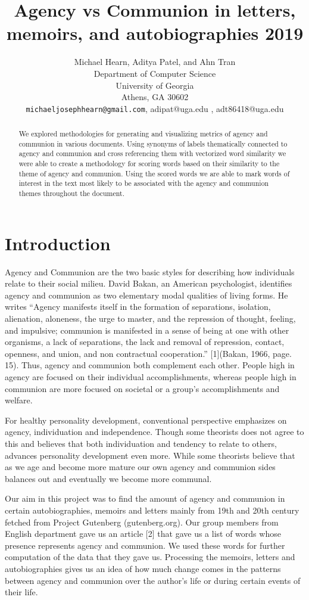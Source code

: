 \documentclass{article}
\title{Agency vs Communion in letters, memoirs, and autobiographies  2019}
\author{%
  Michael Hearn, Aditya Patel, and  Ahn Tran\\ %
  Department of Computer Science\\
  University of Georgia\\
  Athens, GA 30602 \\
  \texttt{michaeljosephhearn@gmail.com}, {adipat@uga.edu} , {adt86418@uga.edu}\\
}
\begin{document}
\maketitle

\begin{abstract}
   We explored methodologies for generating and visualizing metrics of agency and communion in various documents.
   Using synonyms of labels thematically connected to agency and communion and cross referencing them with vectorized word similarity we were able to create a methodology for scoring words based on their similarity to the theme of agency and communion. Using the scored words we are able to mark words of interest in the text most likely to be associated with the agency and communion themes throughout the document.
    
\end{abstract}

\section{Introduction}

Agency and Communion are the two basic styles for describing how individuals relate to their social milieu. David Bakan, an American psychologist, identifies agency and communion as two elementary modal qualities of living forms. He writes “Agency manifests itself in the formation of separations, isolation, alienation, aloneness, the urge to master, and the repression of thought, feeling, and impulsive; communion is manifested in a sense of being at one with other organisms, a lack of separations, the lack and removal of repression, contact, openness, and union, and non contractual cooperation.” [1](Bakan, 1966, page. 15). Thus, agency and communion both complement each other. People high in agency are focused on their individual accomplishments, whereas people high in communion are more focused on societal or a group’s accomplishments and welfare.

For healthy personality development, conventional perspective emphasizes on agency, individuation and independence. Though some theorists does not agree to this and believes that both individuation and tendency to relate to others, advances personality development even more. While some theorists believe that as we age and become more mature our own agency and communion sides balances out and eventually we become more communal.

Our aim in this project was to find the amount of agency and communion in certain autobiographies, memoirs and letters mainly from 19th and 20th century fetched from Project Gutenberg (gutenberg.org). Our group members from English department gave us an article [2] that gave us a list of words whose presence represents agency and communion. We used these words for further computation of the data that they gave us. Processing the memoirs, letters and autobiographies gives us an idea of how much change comes in the patterns between agency and communion over the author's life or during certain events of their life.
\end{document}
